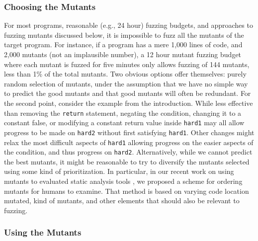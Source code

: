 \subsubsection{Choosing the Mutants}

For most programs, reasonable (e.g., 24 hour) fuzzing budgets, and approaches to fuzzing mutants discussed below, it is impossible to
fuzz all the mutants of the target program.  For instance, if a program has a mere 1,000 lines of code, and 2,000 mutants (not an
implausible number), a 12 hour mutant fuzzing budget where each mutant is fuzzed for five minutes only allows fuzzing of 144 mutants,
less than 1\% of the total mutants.  Two obvious options offer themselves: purely random selection of mutants, under the assumption
that we have no simple way to predict the good mutants and that good mutants will often be redundant.  For the second point, consider the
example from the introduction.  While less effective than removing the {\tt return} statement, negating the condition, changing it to
a constant false, or modifying a constant return value inside {\tt hard1} may all allow progress to be made on {\tt hard2} without first
satisfying {\tt hard1}.  Other changes might relax the most difficult aspects of {\tt hard1} allowing progress on the easier aspects
of the condition, and thus progress on {\tt hard2}.   Alternatively, while we cannot predict the best mutants, it might be reasonable
to try to diversify the mutants selected using some kind of prioritization.  In particular, in our recent work on using mutants to
evaluated static analysis tools \cite{QRS2021}, we proposed a scheme for ordering mutants for humans to examine.  That method is based
on varying code location mutated, kind of mutants, and other elements that should also be relevant to fuzzing.

\subsubsection{Using the Mutants}
